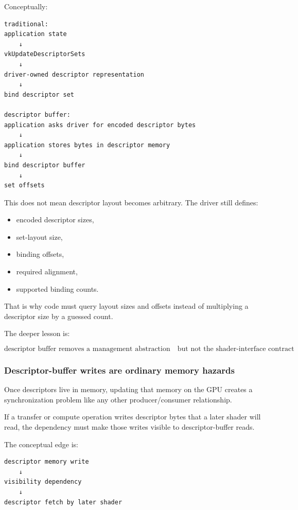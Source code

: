 Conceptually:

\begin{verbatim}
traditional:
application state
    ↓
vkUpdateDescriptorSets
    ↓
driver-owned descriptor representation
    ↓
bind descriptor set

descriptor buffer:
application asks driver for encoded descriptor bytes
    ↓
application stores bytes in descriptor memory
    ↓
bind descriptor buffer
    ↓
set offsets
\end{verbatim}

This does not mean descriptor layout becomes arbitrary. The driver still defines:

\begin{itemize}
\tightlist
\item
  encoded descriptor sizes,
\item
  set-layout size,
\item
  binding offsets,
\item
  required alignment,
\item
  supported binding counts.
\end{itemize}

That is why code must query layout sizes and offsets instead of multiplying a descriptor size by a guessed count.

The deeper lesson is:

\[
\boxed{
\text{descriptor buffer removes a management abstraction}
\quad
\text{but not the shader-interface contract}
}
\]

\subsubsection{Descriptor-buffer writes are ordinary memory hazards}\label{05-engine-i-ch023-descriptor-buffer-writes-are-ordinary-memory-hazards}

\hypertarget{05-engine-i-ch023-descriptor-buffer-writes-are-ordinary-memory-hazards}{}

Once descriptors live in memory, updating that memory on the GPU creates a synchronization problem like any other producer/consumer relationship.

If a transfer or compute operation writes descriptor bytes that a later shader will read, the dependency must make those writes visible to descriptor-buffer reads.

The conceptual edge is:

\begin{verbatim}
descriptor memory write
    ↓
visibility dependency
    ↓
descriptor fetch by later shader
\end{verbatim}

